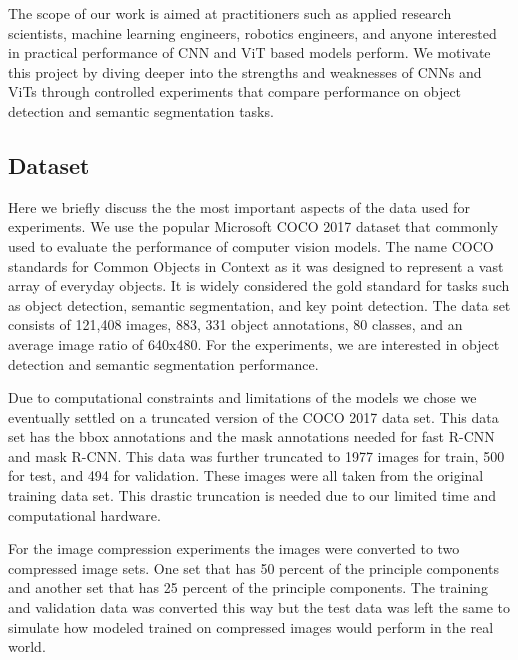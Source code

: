 \documentclass[10pt,twocolumn,letterpaper]{article}
\begin{document}

The scope of our work is aimed at practitioners such as applied research scientists, machine learning engineers, robotics engineers, and anyone interested in practical performance of CNN and ViT based models perform. We motivate this project by diving deeper into the strengths and weaknesses of CNNs and ViTs through controlled experiments that compare performance on object detection and semantic segmentation tasks.

\subsection{Dataset}

Here we briefly discuss the the most important aspects\cite{gebru2021datasheets} of the data used for experiments. We use the popular Microsoft COCO 2017 dataset\cite{lin2014microsoft} that commonly used to evaluate the performance of computer vision models. The name COCO standards for Common Objects in Context as it was designed to represent a vast array of everyday objects. It is widely considered the gold standard for tasks such as object detection, semantic segmentation, and key point detection. The data set consists of 121,408 images, 883, 331 object annotations, 80 classes, and an average image ratio of 640x480. For the experiments, we are interested in object detection and semantic segmentation performance.

Due to computational constraints and limitations of the models we chose we eventually settled on a truncated version of the COCO 2017 data set. This data set has the bbox annotations and the mask annotations needed for fast R-CNN and mask R-CNN. This data was further truncated to 1977 images for train, 500 for test, and 494 for validation. These images were all taken from the original training data set. This drastic truncation is needed due to our limited time and computational hardware.  

For the image compression experiments the images were converted to two compressed image sets. One set that has 50 percent of the principle components and another set that has 25 percent of the principle components. The training and validation data was converted this way but the test data was left the same to simulate how modeled trained on compressed images would perform in the real world. 
\end{document}
